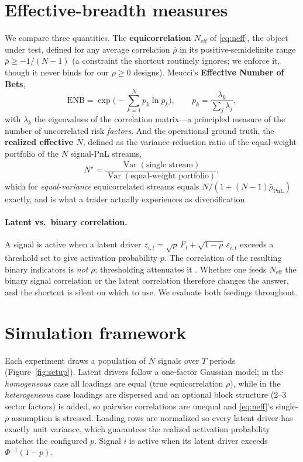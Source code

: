 \documentclass[11pt]{article}
\newcommand{\Neff}{N_{\mathrm{eff}}}
\newcommand{\rbar}{\bar{\rho}}
\begin{document}
\section{Effective-breadth measures}
\label{sec:measures}

We compare three quantities. The \textbf{equicorrelation $\Neff$} of
\eqref{eq:neff}, the object under test, defined for any average correlation
$\rbar$ in its positive-semidefinite range $\rbar \ge -1/(N-1)$ (a constraint the
shortcut routinely ignores; we enforce it, though it never binds for our
$\rho\ge0$ designs). Meucci's \textbf{Effective Number of Bets},
\begin{equation}
\mathrm{ENB} = \exp\!\Big(\!-\!\sum_{k=1}^{N} p_k \ln p_k\Big), \qquad
p_k = \frac{\lambda_k}{\sum_j \lambda_j},
\end{equation}
with $\lambda_k$ the eigenvalues of the correlation matrix---a principled measure
of the number of uncorrelated risk \emph{factors}. And the operational ground
truth, the \textbf{realized effective $N$}, defined as the variance-reduction
ratio of the equal-weight portfolio of the $N$ signal-PnL streams,
\begin{equation}
N^{\star} = \frac{\overline{\operatorname{Var}}(\text{single stream})}{\operatorname{Var}(\text{equal-weight portfolio})},
\end{equation}
which for \emph{equal-variance} equicorrelated streams equals
$N/(1+(N-1)\rbar_{\text{PnL}})$ exactly, and is what a trader actually
experiences as diversification.

\paragraph{Latent vs.\ binary correlation.} A signal is active when a latent driver
$z_{i,t}=\sqrt{\rho}\,F_t+\sqrt{1-\rho}\,\varepsilon_{i,t}$ exceeds a threshold set
to give activation probability $p$. The correlation of the resulting binary
indicators is \emph{not} $\rho$; thresholding attenuates it
\citep{pearson1900tetrachoric}. Whether one feeds $\Neff$ the binary signal
correlation or the latent correlation therefore changes the answer, and the
shortcut is silent on which to use. We evaluate both feedings throughout.

\section{Simulation framework}
\label{sec:framework}

Each experiment draws a population of $N$ signals over $T$ periods
(Figure~\ref{fig:setup}). Latent drivers follow a one-factor Gaussian model; in
the \emph{homogeneous} case all loadings are equal (true equicorrelation
$\rho$), while in the \emph{heterogeneous} case loadings are dispersed and an
optional block structure (2--3 sector factors) is added, so pairwise
correlations are unequal and \eqref{eq:neff}'s single-$\rbar$ assumption is
stressed. Loading rows are normalized so every latent driver has exactly unit
variance, which guarantees the realized activation probability matches the
configured $p$. Signal $i$ is active when its latent driver exceeds
$\Phi^{-1}(1-p)$.
\end{document}
